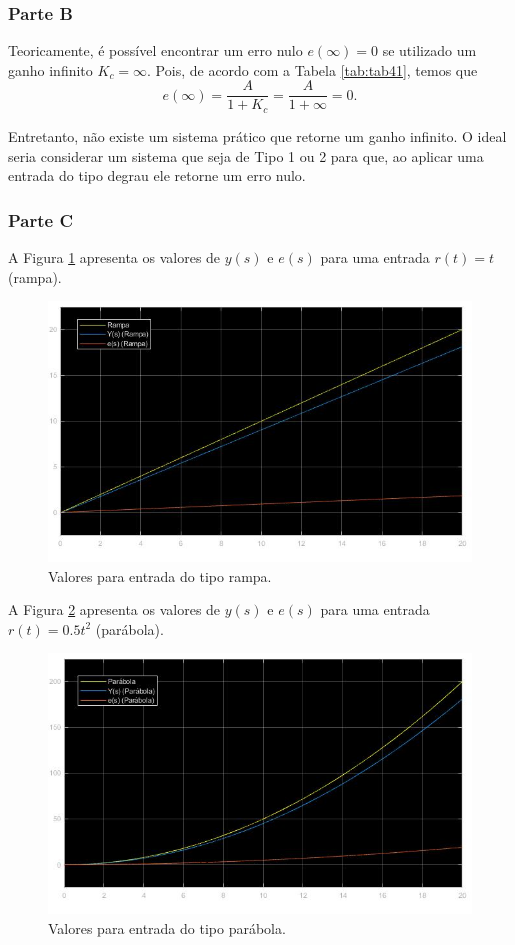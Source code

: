 \documentclass[
]{book}
\begin{document}
\hypertarget{parte-b-1}{%
\subsubsection*{Parte B}\label{parte-b-1}}

Teoricamente, é possível encontrar um erro nulo \(e(\infty) = 0\) se utilizado um ganho infinito \(K_c = \infty\). Pois, de acordo com a Tabela \ref{tab:tab41}, temos que
\[
e(\infty) = \frac {A}{1+K_c} = \frac {A}{1+\infty} = 0.
\]

Entretanto, não existe um sistema prático que retorne um ganho infinito. O ideal seria considerar um sistema que seja de Tipo 1 ou 2 para que, ao aplicar uma entrada do tipo degrau ele retorne um erro nulo.

\hypertarget{parte-c}{%
\subsubsection*{Parte C}\label{parte-c}}

A Figura \ref{fig:fig41C1} apresenta os valores de \(y(s)\) e \(e(s)\) para uma entrada \(r(t) = t\) (rampa).

\begin{figure}
\includegraphics[width=0.8\linewidth]{Imagens/Lab4/Resolução/prob1C1} \caption{Valores para entrada do tipo rampa.}\label{fig:fig41C1}
\end{figure}

A Figura \ref{fig:fig41C2} apresenta os valores de \(y(s)\) e \(e(s)\) para uma entrada \(r(t) = 0.5t^2\) (parábola).

\begin{figure}
\includegraphics[width=0.8\linewidth]{Imagens/Lab4/Resolução/prob1C2} \caption{Valores para entrada do tipo parábola.}\label{fig:fig41C2}
\end{figure}
\end{document}
